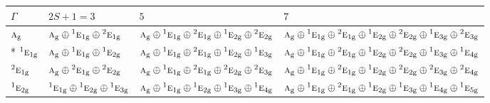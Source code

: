 \documentclass[10pt,a4paper]{article}
\numberwithin{equation}{section}
\newcommand{\irr}[1]{\text{\normalfont\scshape #1}}
\newcommand{\conjpair}[1]{{}^{#1}}
\newcommand{\ptag}[1]{\mathrm{#1}}
\begin{document}
{\small\setlength{\tabcolsep}{3pt}\begin{longtable}{@{}l>{\RaggedRight\arraybackslash}p{}>{\RaggedRight\arraybackslash}p{}>{\RaggedRight\arraybackslash}p{}@{}}\toprule
$\Gamma$ & $2S + 1 = 3$ & $5$ & $7$\\\midrule\endhead
\bottomrule\endfoot\endlastfoot
$\irr{a}_{\ptag{g}}$ & $\irr{a}_{\ptag{g}}\oplus \conjpair{1}\irr{e}_{1\ptag{g}}\oplus \conjpair{2}\irr{e}_{1\ptag{g}}$ & $\irr{a}_{\ptag{g}}\oplus \conjpair{1}\irr{e}_{1\ptag{g}}\oplus \conjpair{2}\irr{e}_{1\ptag{g}}\oplus \conjpair{1}\irr{e}_{2\ptag{g}}\oplus \conjpair{2}\irr{e}_{2\ptag{g}}$ & $\irr{a}_{\ptag{g}}\oplus \conjpair{1}\irr{e}_{1\ptag{g}}\oplus \conjpair{2}\irr{e}_{1\ptag{g}}\oplus \conjpair{1}\irr{e}_{2\ptag{g}}\oplus \conjpair{2}\irr{e}_{2\ptag{g}}\oplus \conjpair{1}\irr{e}_{3\ptag{g}}\oplus \conjpair{2}\irr{e}_{3\ptag{g}}$\\*
$\conjpair{1}\irr{e}_{1\ptag{g}}$ & $\irr{a}_{\ptag{g}}\oplus \conjpair{1}\irr{e}_{1\ptag{g}}\oplus \conjpair{1}\irr{e}_{2\ptag{g}}$ & $\irr{a}_{\ptag{g}}\oplus \conjpair{1}\irr{e}_{1\ptag{g}}\oplus \conjpair{2}\irr{e}_{1\ptag{g}}\oplus \conjpair{1}\irr{e}_{2\ptag{g}}\oplus \conjpair{1}\irr{e}_{3\ptag{g}}$ & $\irr{a}_{\ptag{g}}\oplus \conjpair{1}\irr{e}_{1\ptag{g}}\oplus \conjpair{2}\irr{e}_{1\ptag{g}}\oplus \conjpair{1}\irr{e}_{2\ptag{g}}\oplus \conjpair{2}\irr{e}_{2\ptag{g}}\oplus \conjpair{1}\irr{e}_{3\ptag{g}}\oplus \conjpair{1}\irr{e}_{4\ptag{g}}$\\
$\conjpair{2}\irr{e}_{1\ptag{g}}$ & $\irr{a}_{\ptag{g}}\oplus \conjpair{2}\irr{e}_{1\ptag{g}}\oplus \conjpair{2}\irr{e}_{2\ptag{g}}$ & $\irr{a}_{\ptag{g}}\oplus \conjpair{1}\irr{e}_{1\ptag{g}}\oplus \conjpair{2}\irr{e}_{1\ptag{g}}\oplus \conjpair{2}\irr{e}_{2\ptag{g}}\oplus \conjpair{2}\irr{e}_{3\ptag{g}}$ & $\irr{a}_{\ptag{g}}\oplus \conjpair{1}\irr{e}_{1\ptag{g}}\oplus \conjpair{2}\irr{e}_{1\ptag{g}}\oplus \conjpair{1}\irr{e}_{2\ptag{g}}\oplus \conjpair{2}\irr{e}_{2\ptag{g}}\oplus \conjpair{2}\irr{e}_{3\ptag{g}}\oplus \conjpair{2}\irr{e}_{4\ptag{g}}$\\
$\conjpair{1}\irr{e}_{2\ptag{g}}$ & $\conjpair{1}\irr{e}_{1\ptag{g}}\oplus \conjpair{1}\irr{e}_{2\ptag{g}}\oplus \conjpair{1}\irr{e}_{3\ptag{g}}$ & $\irr{a}_{\ptag{g}}\oplus \conjpair{1}\irr{e}_{1\ptag{g}}\oplus \conjpair{1}\irr{e}_{2\ptag{g}}\oplus \conjpair{1}\irr{e}_{3\ptag{g}}\oplus \conjpair{1}\irr{e}_{4\ptag{g}}$ & $\irr{a}_{\ptag{g}}\oplus \conjpair{1}\irr{e}_{1\ptag{g}}\oplus \conjpair{2}\irr{e}_{1\ptag{g}}\oplus \conjpair{1}\irr{e}_{2\ptag{g}}\oplus \conjpair{1}\irr{e}_{3\ptag{g}}\oplus \conjpair{1}\irr{e}_{4\ptag{g}}\oplus \conjpair{1}\irr{e}_{5\ptag{g}}$\\

\end{longtable}}
\end{document}
